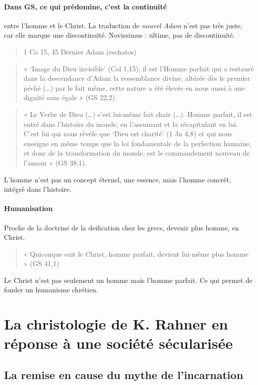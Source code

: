 \paragraph{Dans GS, ce qui prédomine, c'est la continuité} entre l'homme et le Christ. La traduction de \textit{nouvel Adam} n'est pas très juste, car elle marque une discontinuité. Novissimus : ultime, pas de discontinuité.

\begin{quote}
    1 Co 15, 45  Dernier Adam (eschatos)
\end{quote}

\begin{quote}
    « ‘Image du Dieu invisible’ (Col 1,15), il est l’Homme parfait qui a restauré dans la descendance d’Adam la ressemblance divine, altérée dès le premier péché (…) par le fait même, cette nature a été élevée en nous aussi à une dignité sans égale » (GS 22,2). 
\end{quote}

\begin{quote}
    « Le Verbe de Dieu (…) s’est lui-même fait chair (…). Homme parfait, il est entré dans l’histoire du monde, en l’assumant et la récapitulant en lui. C’est lui qui nous révèle que ‘Dieu est charité’ (1 Jn 4,8) et qui nous enseigne en même temps que la loi fondamentale de la perfection humaine, et donc de la transformation du monde, est le commandement nouveau de l’amour » (GS 38,1). 
\end{quote}
L'homme n'est pas un concept éternel, une essence, mais l'homme concrêt, intégré dans l'histoire.


\paragraph{Humanisation} Proche de la doctrine de la deification chez les grecs, devenir plus homme, en Christ.
\begin{quote}
    « Quiconque suit le Christ, homme parfait, devient lui-même plus homme » (GS 41,1)
\end{quote}
Le Christ n'est pas seulement un homme mais l'homme parfait. Ce qui permet de fonder un humanisme chrétien.

\section{La christologie de K. Rahner en réponse à une société sécularisée}

\subsection{La remise en cause du mythe de l’incarnation }
